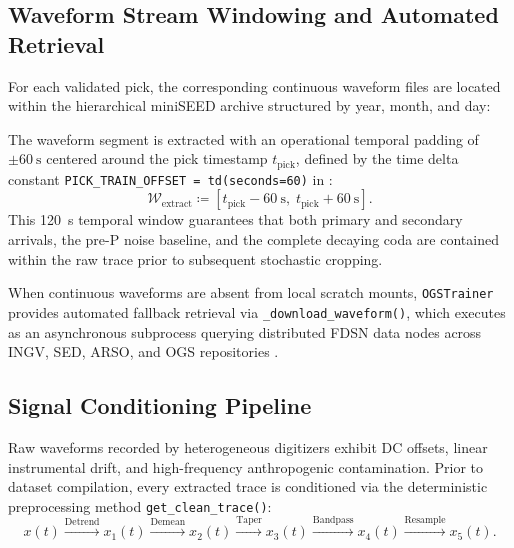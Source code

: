 \subsection{Waveform Stream Windowing and Automated Retrieval}
\label{subsec:waveform_windowing}

For each validated pick, the corresponding continuous waveform files
are located
within the hierarchical miniSEED archive structured by year, month, and day:
\begin{center}
\end{center}

The waveform segment is extracted with an operational temporal padding of
$\pm \qty{60}{\second}$ centered around the pick timestamp
$t_{\mathrm{pick}}$,
defined by the time delta constant \texttt{PICK\_TRAIN\_OFFSET =
td(seconds=60)}
in :
\begin{equation}
  \mathcal{W}_{\mathrm{extract}} \coloneqq \left[ t_{\mathrm{pick}} -
    \qty{60}{\second}, \;
  t_{\mathrm{pick}} + \qty{60}{\second} \right].
  \label{eq:extraction_window}
\end{equation}
This \qty{120}{\second} temporal window guarantees that both
primary and secondary
arrivals, the pre-P noise baseline, and the complete decaying coda
are contained
within the raw trace prior to subsequent stochastic cropping.

When continuous waveforms are absent from local scratch mounts,
\texttt{OGSTrainer}
provides automated fallback retrieval via
\texttt{\_download\_waveform()}, which
executes  as an asynchronous subprocess querying
distributed \ac{FDSN} data nodes across \ac{INGV}, \ac{SED},
\ac{ARSO}, and \ac{OGS}
repositories \parencite{SMINO}.

\subsection{Signal Conditioning Pipeline}
\label{subsec:signal_conditioning}

Raw waveforms recorded by heterogeneous digitizers exhibit DC offsets, linear
instrumental drift, and high-frequency anthropogenic contamination. Prior to
dataset compilation, every extracted trace is conditioned via the deterministic
preprocessing method \texttt{get\_clean\_trace()}:
\begin{equation}
  x(t) \xrightarrow{\text{Detrend}} x_1(t) \xrightarrow{\text{Demean}} x_2(t)
  \xrightarrow{\text{Taper}} x_3(t) \xrightarrow{\text{Bandpass}} x_4(t)
  \xrightarrow{\text{Resample}} x_5(t).
  \label{eq:preprocessing_chain}
\end{equation}

